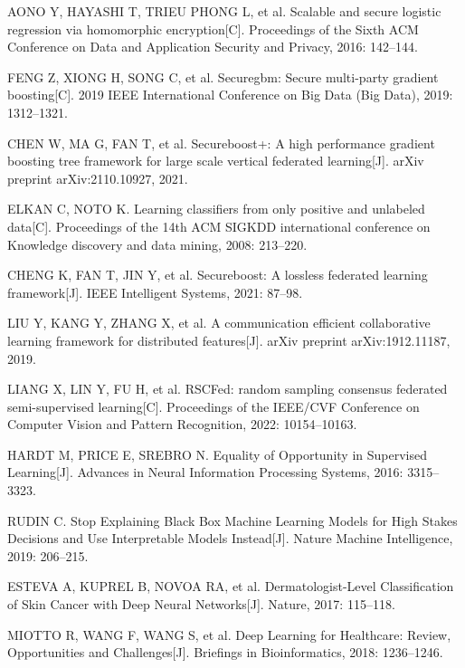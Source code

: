 \begin{thebibliography}{200}
	AONO Y, HAYASHI T, TRIEU PHONG L, et al. Scalable and secure logistic regression via homomorphic encryption[C]. Proceedings of the Sixth ACM Conference on Data and Application Security and Privacy, 2016: 142--144.
	
	FENG Z, XIONG H, SONG C, et al. Securegbm: Secure multi-party gradient boosting[C]. 2019 IEEE International Conference on Big Data (Big Data), 2019: 1312--1321.
	
	CHEN W, MA G, FAN T, et al. Secureboost+: A high performance gradient boosting tree framework for large scale vertical federated learning[J]. arXiv preprint arXiv:2110.10927, 2021.
	
	ELKAN C, NOTO K. Learning classifiers from only positive and unlabeled data[C]. Proceedings of the 14th ACM SIGKDD international conference on Knowledge discovery and data mining, 2008: 213--220.
	
	CHENG K, FAN T, JIN Y, et al. Secureboost: A lossless federated learning framework[J]. IEEE Intelligent Systems, 2021: 87--98.
	
	LIU Y, KANG Y, ZHANG X, et al. A communication efficient collaborative learning framework for distributed features[J]. arXiv preprint arXiv:1912.11187, 2019.
	
	LIANG X, LIN Y, FU H, et al. RSCFed: random sampling consensus federated semi-supervised learning[C]. Proceedings of the IEEE/CVF Conference on Computer Vision and Pattern Recognition, 2022: 10154--10163.
	
	HARDT M, PRICE E, SREBRO N. Equality of Opportunity in Supervised Learning[J]. Advances in Neural Information Processing Systems, 2016: 3315--3323.
	
	RUDIN C. Stop Explaining Black Box Machine Learning Models for High Stakes Decisions and Use Interpretable Models Instead[J]. Nature Machine Intelligence, 2019: 206--215.
	
	ESTEVA A, KUPREL B, NOVOA RA, et al. Dermatologist-Level Classification of Skin Cancer with Deep Neural Networks[J]. Nature, 2017: 115--118.
	
	MIOTTO R, WANG F, WANG S, et al. Deep Learning for Healthcare: Review, Opportunities and Challenges[J]. Briefings in Bioinformatics, 2018: 1236--1246.
	

\end{thebibliography}

